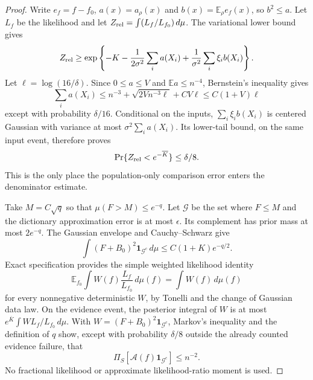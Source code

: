 \begin{proof}
Write $e_f=f-f_0$, $a(x)=a_\rho(x)$ and $b(x)=\mathbb E_\rho e_f(x)$, so $b^2\le a$. Let $L_f$ be the likelihood and let $Z_{\rm rel}=\int(L_f/L_{f_0})\,d\mu$. The variational lower bound gives
\[
 Z_{\rm rel}\ge
 \exp\left\{-K-\frac1{2\sigma^2}\sum_i a(X_i)
                         +\frac1{\sigma^2}\sum_i\xi_i b(X_i)\right\}.
\]
Let $\ell=\log(16/\delta)$. Since $0\le a\le V$ and $\mathbb E a\le n^{-4}$, Bernstein's inequality gives
\[
 \sum_i a(X_i)\le n^{-3}+\sqrt{2Vn^{-3}\ell}+CV\ell
                      \le C(1+V)\ell
\]
except with probability $\delta/16$. Conditional on the inputs, $\sum_i\xi_i b(X_i)$ is centered Gaussian with variance at most $\sigma^2\sum_i a(X_i)$. Its lower-tail bound, on the same input event, therefore proves
\begin{equation}
 \Pr\{Z_{\rm rel}<e^{-\overline K}\}\le\delta/8.
 \label{eq:matched-evidence-event}
\end{equation}
This is the only place the population-only comparison error enters the denominator estimate.

Take $M=C\sqrt q$ so that $\mu(F>M)\le e^{-q}$. Let $\mathcal G$ be the set where $F\le M$ and the dictionary approximation error is at most $\epsilon$. Its complement has prior mass at most $2e^{-q}$. The Gaussian envelope and Cauchy--Schwarz give
\[
 \int (F+B_0)^2\mathbf1_{\mathcal G^c}\,d\mu
                       \le C(1+K)e^{-q/2}.
\]
Exact specification provides the simple weighted likelihood identity
\[
 \mathbb E_{f_0}\int W(f)\frac{L_f}{L_{f_0}}\,d\mu(f)
                        =\int W(f)\,d\mu(f)
\]
for every nonnegative deterministic $W$, by Tonelli and the change of Gaussian data law. On the evidence event, the posterior integral of $W$ is at most $e^{\overline K}\int W L_f/L_{f_0}\,d\mu$. With $W=(F+B_0)^2\mathbf1_{\mathcal G^c}$, Markov's inequality and the definition of $q$ show, except with probability $\delta/8$ outside the already counted evidence failure, that
\begin{equation}
 \Pi_S[\mathcal A(f)\mathbf1_{\mathcal G^c}]\le n^{-2}.
 \label{eq:matched-sieve-tail}
\end{equation}
No fractional likelihood or approximate likelihood-ratio moment is used.


\end{proof}
